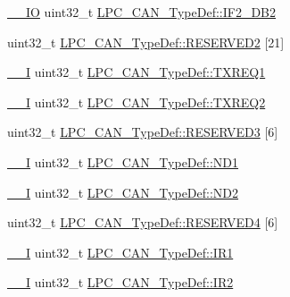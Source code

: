 \begin{DoxyCompactItemize}
\item 
\hyperlink{group___c_m_s_i_s__core__definitions_gaec43007d9998a0a0e01faede4133d6be}{\+\_\+\+\_\+\+IO} uint32\+\_\+t \hyperlink{group___l_p_c11xx___definitions_gaf9b91f8118a022094558ac2d0b7ece77}{L\+P\+C\+\_\+\+C\+A\+N\+\_\+\+Type\+Def\+::\+I\+F2\+\_\+\+D\+B2}
\item 
uint32\+\_\+t \hyperlink{group___l_p_c11xx___definitions_gaccfdfc30dad1c391034d049062b2821b}{L\+P\+C\+\_\+\+C\+A\+N\+\_\+\+Type\+Def\+::\+R\+E\+S\+E\+R\+V\+E\+D2} \mbox{[}21\mbox{]}
\item 
\hyperlink{group___c_m_s_i_s__core__definitions_gaf63697ed9952cc71e1225efe205f6cd3}{\+\_\+\+\_\+I} uint32\+\_\+t \hyperlink{group___l_p_c11xx___definitions_ga4d4eebce6a7b6b29f8556faec742ab9a}{L\+P\+C\+\_\+\+C\+A\+N\+\_\+\+Type\+Def\+::\+T\+X\+R\+E\+Q1}
\item 
\hyperlink{group___c_m_s_i_s__core__definitions_gaf63697ed9952cc71e1225efe205f6cd3}{\+\_\+\+\_\+I} uint32\+\_\+t \hyperlink{group___l_p_c11xx___definitions_gacd04e0f2c97733548cc5150c2f714be2}{L\+P\+C\+\_\+\+C\+A\+N\+\_\+\+Type\+Def\+::\+T\+X\+R\+E\+Q2}
\item 
uint32\+\_\+t \hyperlink{group___l_p_c11xx___definitions_ga92ccc3f8f6d1be742dddf974aaf93654}{L\+P\+C\+\_\+\+C\+A\+N\+\_\+\+Type\+Def\+::\+R\+E\+S\+E\+R\+V\+E\+D3} \mbox{[}6\mbox{]}
\item 
\hyperlink{group___c_m_s_i_s__core__definitions_gaf63697ed9952cc71e1225efe205f6cd3}{\+\_\+\+\_\+I} uint32\+\_\+t \hyperlink{group___l_p_c11xx___definitions_gabf5351cb5630c84bdbf56ac6229d7eb0}{L\+P\+C\+\_\+\+C\+A\+N\+\_\+\+Type\+Def\+::\+N\+D1}
\item 
\hyperlink{group___c_m_s_i_s__core__definitions_gaf63697ed9952cc71e1225efe205f6cd3}{\+\_\+\+\_\+I} uint32\+\_\+t \hyperlink{group___l_p_c11xx___definitions_gad40c20ab0f7db488eb3b52f6e45b726b}{L\+P\+C\+\_\+\+C\+A\+N\+\_\+\+Type\+Def\+::\+N\+D2}
\item 
uint32\+\_\+t \hyperlink{group___l_p_c11xx___definitions_gab147f256c7264f9cf1d23e58138ca1f5}{L\+P\+C\+\_\+\+C\+A\+N\+\_\+\+Type\+Def\+::\+R\+E\+S\+E\+R\+V\+E\+D4} \mbox{[}6\mbox{]}
\item 
\hyperlink{group___c_m_s_i_s__core__definitions_gaf63697ed9952cc71e1225efe205f6cd3}{\+\_\+\+\_\+I} uint32\+\_\+t \hyperlink{group___l_p_c11xx___definitions_gab2c2ae4c02a7a893cef1d8afc393be1a}{L\+P\+C\+\_\+\+C\+A\+N\+\_\+\+Type\+Def\+::\+I\+R1}
\item 
\hyperlink{group___c_m_s_i_s__core__definitions_gaf63697ed9952cc71e1225efe205f6cd3}{\+\_\+\+\_\+I} uint32\+\_\+t \hyperlink{group___l_p_c11xx___definitions_ga110b10d24d5c997f5929cd7364b5c526}{L\+P\+C\+\_\+\+C\+A\+N\+\_\+\+Type\+Def\+::\+I\+R2}

\end{DoxyCompactItemize}
